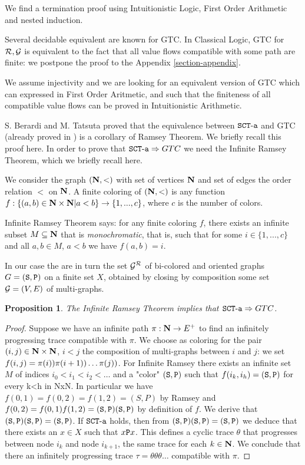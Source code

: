 \documentclass{lmcs}
\newtheorem{proposition}[theorem]{Proposition}
\begin{document}
We find a termination proof using Intuitionistic Logic, First 
Order Arithmetic and nested induction.

Several decidable equivalent are known for GTC. In Classical Logic, GTC for 
${\mathcal R},{\mathcal G}$ is equivalent to the fact that all value flows compatible 
with some path are finite: we postpone the proof to the Appendix \ref{section-appendix}.

We assume injectivity and we are looking for an equivalent version
of GTC which can expressed in First Order Aritmetic, and such that
the finiteness of all compatible value flows can be proved
in Intuitionistic Arithmetic.

S. Berardi and M. Tatsuta proved that the equivalence between ${\tt SCT\mbox{-}a}$ and GTC 
(already proved in \cite{Lee1}) is a corollary of Ramsey Theorem. 
We briefly recall this proof here.
In order to prove that ${\tt SCT\mbox{-}a} \Rightarrow GTC$ 
we need the Infinite Ramsey Theorem, which we briefly recall here. 

We consider the graph $({\bf N},<)$ with set of vertices ${\bf N}$ and set of edges the order relation
$<$ on ${\bf N}$. A finite coloring of $({\bf N},<)$ is any function 
$f : \{(a,b) \in {\bf N} \times {\bf N} | a < b \}  \rightarrow \{1,...,c\}$, where $c$ is the number of colors. 

Infinite Ramsey Theorem says: for any finite coloring $f$, 
there exists an infinite subset $M\subseteq {\bf N}$ that is 
\emph{monochromatic}, that is, such that for some $i \in\{1,...,c\}$ and all $a,b \in M$,
$a<b$ we have $f(a,b)=i$. 

In our case the 
are in turn the set ${\mathcal G}^{\mathcal R}$ of bi-colored and oriented graphs 
$G = ({\tt S},{\tt P})$ on a finite set $X$, obtained by closing by composition
some set ${\mathcal G} = (V,E)$ of multi-graphs.

\begin{proposition}
The Infinite Ramsey Theorem implies that ${\tt SCT\mbox{-}a} \Rightarrow GTC$. 
\end{proposition}

\begin{proof}
Suppose we have an infinite path $\pi : {\bf N} \rightarrow E^+$ 
to find an infinitely progressing trace compatible with $\pi$. 
We choose as coloring for the pair $(i,j)\in {\bf N} \times {\bf N}$, $i<j$ 
the composition of multi-graphs between $i$ and $j$: we set 
$f(i,j) = \label(\pi(i)) \label(\pi(i+1)) \ldots \label(\pi(j))$. 
For Infinite Ramsey there exists an infinite set $M$ of indices $i_0 < i_1 < i_2 < \ldots$ 
and a "color" $({\tt S},{\tt P})$ such that $f(i_k,i_h) = ({\tt S},{\tt P})$ 
for every k<h in NxN. In particular we have $f(0,1) = f(0,2) = f(1,2) = (S,P)$ by Ramsey
and $f(0,2) = f(0,1)f(1,2) = ({\tt S},{\tt P})({\tt S},{\tt P})$ by definition
of $f$. We derive that $({\tt S},{\tt P})({\tt S},{\tt P}) = ({\tt S},{\tt P})$. 
If ${\tt SCT\mbox{-}a}$ holds, then from $({\tt S},{\tt P})({\tt S},{\tt P}) = ({\tt S},{\tt P})$ 
we deduce that there exists an $x \in X$ such that $x {\tt P} x$. 
This defines a cyclic trace $\theta$ that progresses between node $i_k$ and node $i_{k+1}$, 
the same trace for each $k \in {\bf N}$. 
We conclude that there an infinitely progressing trace $\tau = \theta \theta \theta \ldots$ 
compatible with $\pi$.
\end{proof}
\end{document}
